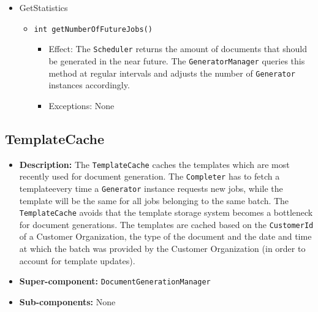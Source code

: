 \documentclass[a4paper,10pt]{article}
\begin{document}
\begin{itemize}
      \item GetStatistics
    \begin{itemize}
        \item \texttt{int getNumberOfFutureJobs()}
        \begin{itemize}
            \item Effect: The \texttt{Scheduler} returns the amount of documents that should be generated in the near future. The \texttt{GeneratorManager} queries this method at regular intervals and adjusts the number of \texttt{Generator} instances accordingly.
            \item Exceptions: None
        \end{itemize}
    \end{itemize}
\end{itemize}

\subsection{TemplateCache}
\begin{itemize}
    \item \textbf{Description:}  The \texttt{TemplateCache} caches the templates which are most recently used for document generation. The \texttt{Completer} has to fetch a templateevery time a \texttt{Generator} instance requests new jobs, while the template will be the same for all jobs belonging to the same batch. The \texttt{TemplateCache} avoids that the template storage system becomes a bottleneck for document generations. The templates are cached based on the \texttt{CustomerId} of a Customer Organization, the type of the document and the date and time at which the batch was provided by the Customer Organization (in order to account for template updates).
    \item \textbf{Super-component:} \texttt{DocumentGenerationManager}
    \item \textbf{Sub-components:} None
\end{itemize}
\end{document}
